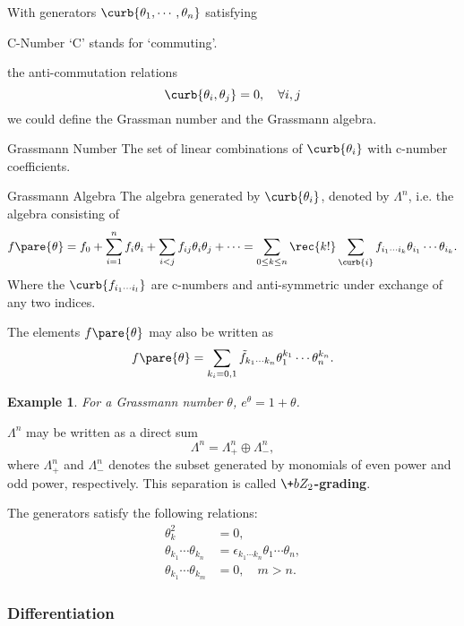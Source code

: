 \documentclass[hidelinks]{article}
\newtheorem{example}{Example}
\begin{document}
With generators $\curb{\theta_1,\cdots,\theta_n}$ satisfying \begin{margindef}{C-Number}
    `C' stands for `commuting'.
\end{margindef} the anti-commutation relations
\[ \curb{\theta_i,\theta_j} = 0,\quad \forall i,j \]
we could define the Grassman number and the Grassmann algebra.
\begin{termdef}[\baselineskip]{Grassmann Number}
    The set of linear combinations of $\curb{\theta_i}$ with c-number coefficients.
\end{termdef}
\begin{termdef}{Grassmann Algebra}
    The algebra generated by $\curb{\theta_i}$, denoted by $\Lambda^n$, i.e. the algebra consisting of
    \[ f\pare{\theta} = f_0 + \sum_{i=1}^n f_i\theta_i + \sum_{i<j}f_{ij}\theta_i\theta_j + \cdots = \sum_{0\le k\le n} \rec{k!}\sum_{\curb{i}}f_{i_1\cdots i_k}\theta_{i_1}\cdots \theta_{i_k}. \]
    Where the $\curb{f_{i_1\cdots i_l}}$ are c-numbers and anti-symmetric under exchange of any two indices.
\end{termdef}
The elements $f\pare{\theta}$ may also be written as
\[ f\pare{\theta} = \sum_{k_i = 0,1} \tilde{f}_{k_1\cdots k_n}\theta_1^{k_1}\cdots \theta_n^{k_n}. \]
\begin{sample}
    \begin{example}
        For a Grassmann number $\theta$, $e^\theta = 1+\theta$.
    \end{example}
\end{sample}
$\Lambda^n$ may be written as a direct sum
\[ \Lambda^n = \Lambda^n_+ \oplus \Lambda^n_-, \]
where $\Lambda^n_+$ and $\Lambda^n_-$ denotes the subset generated by monomials of even power and odd power, respectively. This separation is called \textbf{$\+bZ_2$-grading}.
\par
The generators satisfy the following relations:
\begin{align*}
    \theta_k^2 &= 0, \\
    \theta_{k_1}\cdots \theta_{k_n} &= \epsilon_{k_1 \cdots k_n}\theta_1\cdots\theta_n, \\
    \theta_{k_1}\cdots \theta_{k_m} &= 0,\quad m>n.
\end{align*}


\subsubsection{Differentiation} %
\label{ssub:differentiation}
\end{document}

